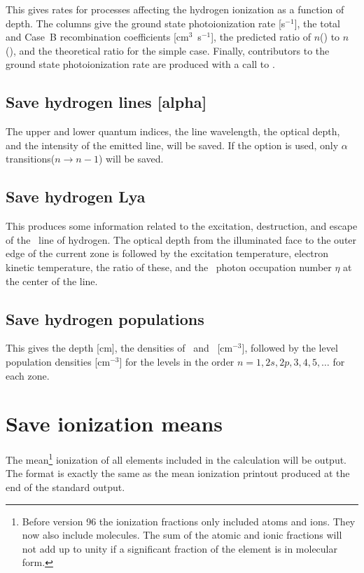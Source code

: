 This gives rates for processes affecting the hydrogen ionization as a
function of depth.  The columns give the ground state photoionization rate
[s$^{-1}$], the total and Case~B recombination coefficients [cm$^3$~s$^{-1}$], the
predicted ratio of $n$(\hplus) to $n$(\hO), and the theoretical ratio for the simple
case.  Finally, contributors to the ground state photoionization rate are
produced with a call to .

\subsection{Save hydrogen lines [alpha]}

The upper and lower quantum indices, the line wavelength, the optical
depth, and the intensity of the emitted line, will be saved. If the 
option is used, only $\alpha$ transitions($n\to n-1$) will be saved.

\subsection{Save hydrogen Lya}

This produces some information related to the excitation, destruction,
and escape of the \la\ line of hydrogen.  The optical depth from the
illuminated face to the outer edge of the current zone is followed by the
excitation temperature, electron kinetic temperature, the ratio of these,
and the \la\ photon occupation number $\eta$ at the center of the line.

\subsection{Save hydrogen populations}

This gives the depth [cm], the densities of \hO\ and \hplus\ [cm$^{-3}$],
followed by the level population densities [cm$^{-3}$]
for the levels in the order $n = 1, 2s, 2p, 3, 4, 5,\dots$ for each zone.

\section{Save ionization means}
\label{sec:CommandSaveIonizationMeans} 

The mean\footnote{Before version 96 the ionization fractions only included atoms and
ions.  They now also include molecules.  The sum of the atomic and ionic
fractions will not add up to unity if a significant fraction of the element
is in molecular form.} ionization of all elements included in the calculation will
be output.  The format is exactly the same as the mean ionization printout
produced at the end of the standard output.

